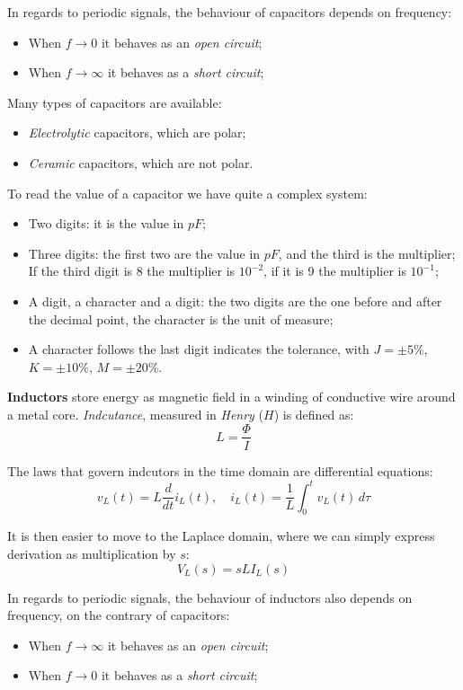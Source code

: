 \documentclass[a4paper,11pt]{article}
\begin{document}
In regards to periodic signals, the behaviour of capacitors depends on frequency:
\begin{itemize}
	\item When $f \rightarrow 0$ it behaves as an \textit{open circuit};
	\item When $f \rightarrow \infty$ it behaves as a \textit{short circuit};
\end{itemize}

Many types of capacitors are available:
\begin{itemize}
	\item \textit{Electrolytic} capacitors, which are polar;
	\item \textit{Ceramic} capacitors, which are not polar.
\end{itemize}

To read the value of a capacitor we have quite a complex system:
\begin{itemize}
	\item Two digits: it is the value in $pF$;
	\item Three digits: the first two are the value in $pF$, and the third is the multiplier; If the third digit is 8 the multiplier is $10^{-2}$, if it is 9 the multiplier is $10^{-1}$;
	\item A digit, a character and a digit: the two digits are the one before and after the decimal point, the character is the unit of measure;
	\item A character follows the last digit indicates the tolerance, with $J = \pm 5 \%$, $K = \pm 10 \%$, $M = \pm 20 \%$.
\end{itemize}

\textbf{\textsf{Inductors}} store energy as magnetic field in a winding of conductive wire around a metal core.
\textit{Indcutance}, measured in \textit{Henry} ($H$) is defined as:
$$
L = \frac{\Phi}{I}
$$

The laws that govern indcutors in the time domain are differential equations:
$$
v_L(t) = L \frac{d}{dt} i_L(t), \quad
i_L(t) = \frac{1}{L} \int_0^t v_L(t) \, d\tau
$$

It is then easier to move to the Laplace domain, where we can simply express derivation as multiplication by $s$:
$$
V_L(s) = s L I_L(s) 
$$

In regards to periodic signals, the behaviour of inductors also depends on frequency, on the contrary of capacitors:
\begin{itemize}
	\item When $f \rightarrow \infty$ it behaves as an \textit{open circuit};
	\item When $f \rightarrow 0$ it behaves as a \textit{short circuit};
\end{itemize}
\end{document}
